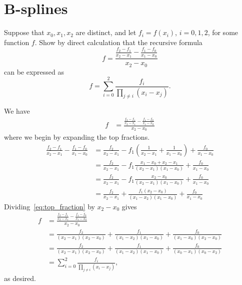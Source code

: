\section{B-splines}

\begin{exercise}
    Suppose that $x_0, x_1, x_2$ are distinct, and let $f_i = f(x_i)$, $i = 0, 1, 2$, for some function $f$.
    Show by direct calculation that the recursive formula
    \begin{equation*}
        [x_0, x_1, x_2]f =
        \frac{
            \frac{f_2 - f_1}{x_2 - x_1}
            - \frac{f_1 - f_0}{x_1 - x_0}
        }{x_2 - x_0}
    \end{equation*}
    can be expressed as
    \begin{equation*}
        [x_0, x_1, x_2]f = \sum_{i=0}^{2} \frac{f_i}{\prod_{j \neq i} (x_i - x_j)}.
    \end{equation*}
\end{exercise}

\begin{solution}
    We have
    \begin{align*}
        [x_0, x_1, x_2]f
        &= \frac{
            \frac{f_2 - f_1}{x_2 - x_1}
            - \frac{f_1 - f_0}{x_1 - x_0}
        }{x_2 - x_0}
    \end{align*}
    where we begin by expanding the top fractions.
    \begin{align}
        \frac{f_2 - f_1}{x_2 - x_1} - \frac{f_1 - f_0}{x_1 - x_0}
        &= \frac{f_2}{x_2 - x_1} - f_1 \left( \frac{1}{x_2 - x_1} + \frac{1}{x_1 - x_0} \right) + \frac{f_0}{x_1 - x_0} \nonumber \\
        &= \frac{f_2}{x_2 - x_1} - f_1 \frac{x_1 - x_0 + x_2 - x_1}{(x_2 - x_1)(x_1 - x_0)} + \frac{f_0}{x_1 - x_0} \nonumber \\
        &= \frac{f_2}{x_2 - x_1} - f_1 \frac{x_2 - x_0}{(x_2 - x_1)(x_1 - x_0)} + \frac{f_0}{x_1 - x_0} \nonumber \\
        &= \frac{f_2}{x_2 - x_1} + \frac{f_1(x_2 - x_0)}{(x_1 - x_2)(x_1 - x_0)} + \frac{f_0}{x_1 - x_0} \label{eq:top_fraction}
    \end{align}
    Dividing~\eqref{eq:top_fraction} by $x_2 - x_0$ gives
    \begin{align*}
        [x_0, x_1, x_2]f
        &= \frac{
            \frac{f_2 - f_1}{x_2 - x_1}
            - \frac{f_1 - f_0}{x_1 - x_0}
        }{x_2 - x_0} \\
        &= \frac{f_2}{(x_2 - x_1)(x_2 - x_0)}
        + \frac{f_1}{(x_1 - x_2)(x_1 - x_0)}
        + \frac{f_0}{(x_1 - x_0)(x_2 - x_0)} \\
        &= \frac{f_2}{(x_2 - x_1)(x_2 - x_0)}
        + \frac{f_1}{(x_1 - x_2)(x_1 - x_0)}
        + \frac{f_0}{(x_0 - x_1)(x_0 - x_2)} \\
        &= \sum_{i=0}^{2} \frac{f_i}{\prod_{j \neq i} (x_i - x_j)},
    \end{align*}
    as desired.
\end{solution}


